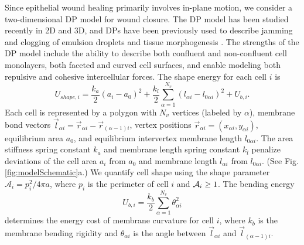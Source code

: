 \documentclass[%
 reprint,
superscriptaddress,
amsmath,amssymb,
prl,
floatfix,
]{revtex4-2}
\begin{document}
Since epithelial wound healing primarily involves in-plane motion, we consider a two-dimensional DP model for wound closure. The DP model has been studied recently in 2D and 3D, and DPs have been previously used to describe jamming and clogging of emulsion droplets and tissue morphogenesis \cite{boromand2018jamming, cheng2022hopper, wang2021structural, treado2021bridging, treado2022localized}. The strengths of the DP model include the ability to describe both confluent and non-confluent cell monolayers, both faceted and curved cell surfaces, and enable modeling both repulsive and cohesive intercellular forces. The shape energy \cite{boromand2018jamming} for each cell $i$ is 
\begin{equation}
    \label{eq:energy_DPM}
    U_{shape, i} = \frac{k_a}{2}\left(a_i - a_0\right)^2 + \frac{k_l}{2}\sum_{\alpha=1}^{N_v}\left(l_{\alpha i} - l_{0\alpha i}\right)^2 + U_{b,i}.
\end{equation}
Each cell is represented by a polygon with $N_v$ vertices (labeled by $\alpha$), membrane bond vectors $\vec{l}_{\alpha i} = \vec{r}_{\alpha i} - \vec{r}_{(\alpha-1) i}$, vertex positions ${\vec r}_{\alpha i}=(x_{\alpha i},y_{\alpha i})$, equilibrium area $a_0$, and equilibrium intervertex membrane length $l_{0\alpha i}$. The area stiffness spring constant $k_a$ and membrane length spring constant $k_l$ penalize deviations of the cell area $a_i$ from $a_0$ and membrane length $l_{\alpha i}$ from $l_{0\alpha i}$. (See Fig. \ref{fig:modelSchematic}a.) We quantify cell shape using the shape parameter $\mathcal{A}_i = p_i^2/4\pi a$, where $p_i$ is the perimeter of cell $i$ and ${\cal A}_i \ge 1$. The bending energy 
\begin{equation}
    \label{eq:bending}
    U_{b, i} = \frac{k_b}{2}\sum_{\alpha=1}^{N_v}\theta_{\alpha i}^2
\end{equation} 
determines the energy cost of membrane curvature for cell $i$, where $k_b$ is the membrane bending rigidity and $\theta_{\alpha i}$ is the angle between $\vec{l}_{\alpha i}$ and $\vec{l}_{(\alpha-1)i}$.
\end{document}
